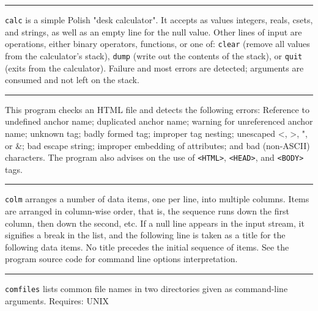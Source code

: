 {\vspace{0.25cm}\hrule{}

\texttt{calc} is a simple Polish "desk calculator". It accepts as values
integers, reals, csets, and strings, as well as
an empty line for the null value. Other lines of input are operations,
either binary operators, functions, or one of:
\texttt{clear} (remove all values from the
calculator's stack), \texttt{dump} (write out the contents of the stack), or \texttt{quit} (exits from the calculator).
Failure and most errors are detected; arguments are consumed and not
left on the stack.

\vspace{0.25cm}\hrule{}

This program checks an HTML file and detects the following
errors: Reference to undefined anchor name; duplicated anchor name;
warning for unreferenced anchor name; unknown tag; badly formed tag;
improper tag nesting; unescaped {\textless}, {\textgreater}, ", or \&;
bad escape string; improper embedding of attributes; and
bad (non-ASCII) characters.
The program also advises on the use of
\texttt{{\textless}HTML{\textgreater}},
\texttt{{\textless}HEAD{\textgreater}}, and
\texttt{{\textless}BODY{\textgreater}} tags. 

\vspace{0.25cm}\hrule{}

\texttt{colm} arranges a number of data items, one per line, into
multiple columns. Items are arranged in column-wise order, that is, the
sequence runs down the first column, then down the second, etc. If a
null line appears in the input stream, it signifies a break in the
list, and the following line is taken as a title for the following data
items. No title precedes the initial sequence of items.  See the program
source code for command line options interpretation.


\vspace{0.25cm}\hrule{}

\texttt{comfiles} lists common file names in two directories given as
command-line arguments. Requires: UNIX 

}
